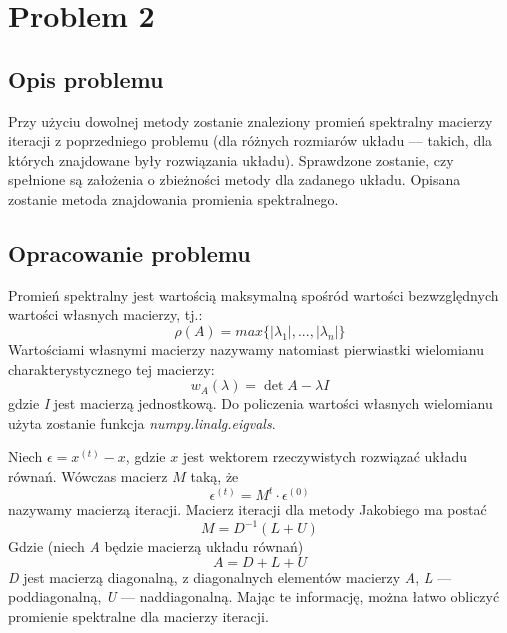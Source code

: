 \documentclass{article}
\begin{document}
\newpage

\section{Problem 2}
\subsection{Opis problemu}
Przy użyciu dowolnej metody zostanie znaleziony promień spektralny macierzy iteracji z poprzedniego problemu
(dla różnych rozmiarów układu --- takich, dla których znajdowane były rozwiązania układu).
Sprawdzone zostanie, czy spełnione są założenia o zbieżności metody dla zadanego układu. Opisana zostanie metoda znajdowania
promienia spektralnego.

\subsection{Opracowanie problemu}
Promień spektralny jest wartością maksymalną spośród wartości bezwzględnych wartości własnych macierzy, tj.:
$$\rho(A)=max\{|\lambda_1|,..., |\lambda_n|\}$$
Wartościami własnymi macierzy nazywamy natomiast pierwiastki wielomianu charakterystycznego tej macierzy:
$$w_{A}(\lambda)=\det{A- \lambda I}$$
gdzie \textit{I} jest macierzą jednostkową. Do policzenia wartości własnych wielomianu użyta zostanie funkcja 
\textit{numpy.linalg.eigvals}.

Niech $\epsilon=x^{(t)}-x$, gdzie $x$ jest wektorem rzeczywistych rozwiązać układu równań. Wówczas macierz $M$ taką, że
$$\epsilon^{(t)}=M^t \cdot \epsilon^{(0)}$$
nazywamy macierzą iteracji.
Macierz iteracji dla metody Jakobiego ma postać
$$M=D^{-1}(L+U)$$
Gdzie (niech \textit{A} będzie macierzą układu równań)
$$A = D + L + U$$
\textit{D} jest macierzą diagonalną, z diagonalnych elementów macierzy \textit{A}, \textit{L} --- poddiagonalną, 
\textit{U} --- naddiagonalną. Mając te informację, można łatwo obliczyć promienie spektralne dla macierzy iteracji.

\newpage
\thispagestyle{empty}
\end{document}
